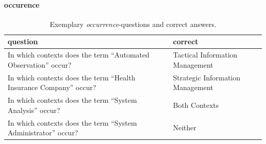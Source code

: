 \documentclass{IOS-Book-Article}     %
\begin{document}


\iffalse
\paragraph{occurence}
\begin{table}[h]
\begin{tabulary}{\textwidth}{LL}
\toprule
question	&correct\\
\midrule
In which contexts does the term \enquote{Automated Observation} occur?		&Tactical Information Management \\
In which contexts does the term \enquote{Health Insurance Company} occur?	&Strategic Information Management \\
In which contexts does the term \enquote{System Analysis} occur?			&Both Contexts \\
In which contexts does the term \enquote{System Administrator} occur?		&Neither\\
\bottomrule
\end{tabulary}
\caption{Exemplary \emph{occurrence}-questions and correct answers.}
\label{tab:occurence}
\end{table}
\end{document}
